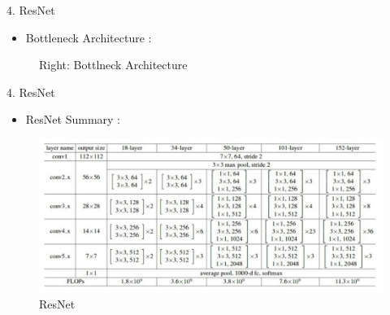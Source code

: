 \documentclass{beamer}
\begin{document}
\begin{frame}{4. ResNet}
	\vspace{10pt}
	\begin{itemize}
		\item Bottleneck Architecture :
	\end{itemize}
	\vspace{10pt}
	\begin{figure}[h]		
		\centering
		\quad
		\caption{Right: Bottlneck Architecture}
		\label{resblock}
	\end{figure}
\end{frame}


\begin{frame}{4. ResNet}
	\vspace{10pt}
	\begin{itemize}
		\item ResNet Summary :
	\end{itemize}
	\vspace{10pt}
	\begin{figure}[h]		
		\centering
		\includegraphics[scale=0.55]{./res/resnetstr.PNG}
		\caption{ResNet}
		\label{resnet}
	\end{figure}
\end{frame}
\end{document}
